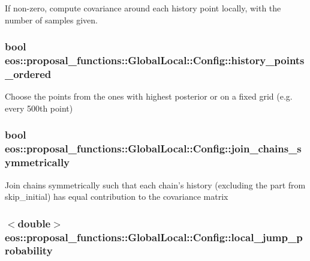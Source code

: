 \label{structeos_1_1proposal__functions_1_1GlobalLocal_1_1Config_ac6b275330dd84325a42c3715d318551f}
If non-\/zero, compute covariance around each history point locally, with the number of samples given. \hypertarget{structeos_1_1proposal__functions_1_1GlobalLocal_1_1Config_a74fc0b244166ec0fe894422ad254ca06}{
\subsubsection[{history\_\-points\_\-ordered}]{\setlength{\rightskip}{0pt plus 5cm}bool {\bf eos::proposal\_\-functions::GlobalLocal::Config::history\_\-points\_\-ordered}}}
\label{structeos_1_1proposal__functions_1_1GlobalLocal_1_1Config_a74fc0b244166ec0fe894422ad254ca06}
Choose the points from the ones with highest posterior or on a fixed grid (e.g. every 500th point) \hypertarget{structeos_1_1proposal__functions_1_1GlobalLocal_1_1Config_aecbd678a2838e79d850bb7aa732bb8cd}{
\subsubsection[{join\_\-chains\_\-symmetrically}]{\setlength{\rightskip}{0pt plus 5cm}bool {\bf eos::proposal\_\-functions::GlobalLocal::Config::join\_\-chains\_\-symmetrically}}}
\label{structeos_1_1proposal__functions_1_1GlobalLocal_1_1Config_aecbd678a2838e79d850bb7aa732bb8cd}
Join chains symmetrically such that each chain's history (excluding the part from skip\_\-initial) has equal contribution to the covariance matrix \hypertarget{structeos_1_1proposal__functions_1_1GlobalLocal_1_1Config_ad078b40f919f62b9311f433b1152bbb6}{
\subsubsection[{local\_\-jump\_\-probability}]{$<$double$>$ {\bf eos::proposal\_\-functions::GlobalLocal::Config::local\_\-jump\_\-probability}}}
\label{structeos_1_1proposal__functions_1_1GlobalLocal_1_1Config_ad078b40f919f62b9311f433b1152bbb6}


